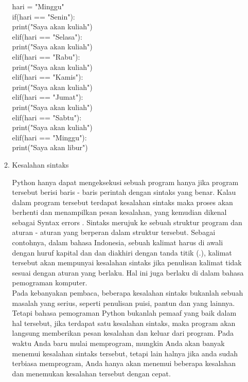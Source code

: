 \begin{enumerate}
\begin{enumerate}
hari = "Minggu"\\

if(hari == "Senin"):\\
    print("Saya akan kuliah")\\
elif(hari == "Selasa"):\\
    print("Saya akan kuliah")\\
elif(hari == "Rabu"):\\
    print("Saya akan kuliah")\\
elif(hari == "Kamis"):\\
    print("Saya akan kuliah")\\
elif(hari == "Jumat"):\\
    print("Saya akan kuliah")\\
elif(hari == "Sabtu"):\\
    print("Saya akan kuliah")\\
elif(hari == "Minggu"):\\
    print("Saya akan libur")\\


\item Kesalahan sintaks

Python hanya dapat mengeksekusi sebuah program hanya jika program tersebut
berisi baris - baris perintah dengan sintaks yang benar. Kalau dalam program
 tersebut terdapat kesalahan sintaks maka proses akan berhenti dan menampilkan 
pesan kesalahan, yang kemudian dikenal sebagai Syntax errors . Sintaks merujuk 
ke sebuah struktur program dan aturan - aturan yang berperan dalam struktur 
tersebut. Sebagai contohnya, dalam bahasa Indonesia, sebuah kalimat harus di 
awali dengan huruf kapital dan dan diakhiri dengan tanda titik (.), kalimat tersebut
akan mempunyai kesalahan sintaks jika penulisan kalimat tidak sesuai dengan aturan 
yang berlaku. Hal ini juga berlaku di dalam bahasa
pemograman komputer.\\

Pada kebanyakan pembaca, beberapa kesalahan sintaks bukanlah sebuah masalah
yang serius, seperti penulisan puisi, pantun dan yang lainnya. Tetapi bahasa pemograman
Python bukanlah pemaaf yang baik dalam hal tersebut, jika terdapat satu
kesalahan sintaks, maka program akan langsung memberikan pesan kesalahan dan
keluar dari program. Pada waktu Anda baru mulai memprogram, mungkin Anda
akan banyak menemui kesalahan sintaks tersebut, tetapi lain halnya jika anda sudah
terbiasa memprogram, Anda hanya akan menemui beberapa kesalahan dan
menemukan kesalahan tersebut dengan cepat.\\


\end{enumerate}
\end{enumerate}
